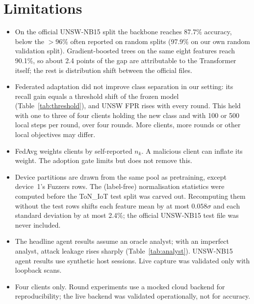 \section{Limitations}
\begin{itemize}
\item On the official UNSW-NB15 split the backbone reaches 87.7\% accuracy,
below the $>$96\% often reported on random splits (97.9\% on our own random
validation split). Gradient-boosted trees on the same eight features reach
90.1\%, so about 2.4 points of the gap are attributable to the Transformer
itself; the rest is distribution shift between the official files.
\item Federated adaptation did not improve class separation in our setting:
its recall gain equals a threshold shift of the frozen model
(Table~\ref{tab:threshold}), and UNSW FPR rises with every round. This held
with one to three of four clients holding the new class and with 100 or 500
local steps per round, over four rounds. More clients, more rounds or other
local objectives may differ.
\item FedAvg weights clients by self-reported $n_k$. A malicious client can
inflate its weight. The adoption gate limits but does not remove this.
\item Device partitions are drawn from the same pool as pretraining, except
device~1's Fuzzers rows. The (label-free) normalisation statistics were computed
before the ToN\_IoT test split was carved out. Recomputing them without the test
rows shifts each feature mean by at most $0.058\sigma$ and each standard deviation
by at most 2.4\%; the official UNSW-NB15 test file was never included.
\item The headline agent results assume an oracle analyst; with an
imperfect analyst, attack leakage rises sharply (Table~\ref{tab:analyst}).
UNSW-NB15 agent results use synthetic host sessions. Live capture was
validated only with loopback scans.
\item Four clients only. Round experiments use a mocked cloud backend for
reproducibility; the live backend was validated operationally, not for accuracy.
\end{itemize}
